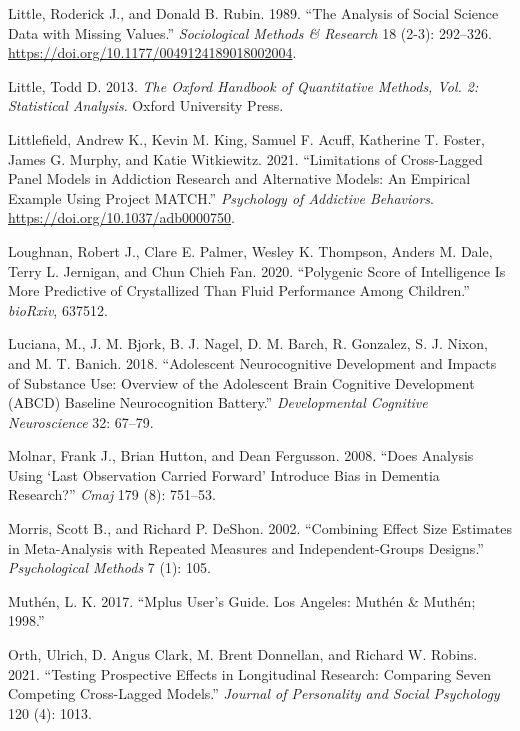 \documentclass[
  letterpaper,
  DIV=11,
  numbers=noendperiod]{scrartcl}
\newlength{\cslhangindent}
\newlength{\cslentryspacingunit} %
\newenvironment{CSLReferences}[2] %
 {%
  \setlength{\parindent}{0pt}
  \ifodd #1
  \let\oldpar\par
  \def\par{\hangindent=\cslhangindent\oldpar}
  \fi
  \setlength{\parskip}{#2\cslentryspacingunit}
 }%
 {}
\begin{document}
\begin{CSLReferences}{1}{0}
\leavevmode{}%
Little, Roderick J., and Donald B. Rubin. 1989. {``The {Analysis} of
{Social} {Science} {Data} with {Missing} {Values}.''} \emph{Sociological
Methods \& Research} 18 (2-3): 292--326.
\url{https://doi.org/10.1177/0049124189018002004}.

\leavevmode{}%
Little, Todd D. 2013. \emph{The {Oxford} {Handbook} of {Quantitative}
{Methods}, {Vol}. 2: {Statistical} {Analysis}}. Oxford University Press.

\leavevmode{}%
Littlefield, Andrew K., Kevin M. King, Samuel F. Acuff, Katherine T.
Foster, James G. Murphy, and Katie Witkiewitz. 2021. {``Limitations of
Cross-Lagged Panel Models in Addiction Research and Alternative Models:
{An} Empirical Example Using Project {MATCH}.''} \emph{Psychology of
Addictive Behaviors}. \url{https://doi.org/10.1037/adb0000750}.

\leavevmode{}%
Loughnan, Robert J., Clare E. Palmer, Wesley K. Thompson, Anders M.
Dale, Terry L. Jernigan, and Chun Chieh Fan. 2020. {``Polygenic Score of
Intelligence Is More Predictive of Crystallized Than Fluid Performance
Among Children.''} \emph{bioRxiv}, 637512.

\leavevmode{}%
Luciana, M., J. M. Bjork, B. J. Nagel, D. M. Barch, R. Gonzalez, S. J.
Nixon, and M. T. Banich. 2018. {``Adolescent Neurocognitive Development
and Impacts of Substance Use: {Overview} of the Adolescent Brain
Cognitive Development ({ABCD}) Baseline Neurocognition Battery.''}
\emph{Developmental Cognitive Neuroscience} 32: 67--79.

\leavevmode{}%
Molnar, Frank J., Brian Hutton, and Dean Fergusson. 2008. {``Does
Analysis Using {`Last Observation Carried Forward'} Introduce Bias in
Dementia Research?''} \emph{Cmaj} 179 (8): 751--53.

\leavevmode{}%
Morris, Scott B., and Richard P. DeShon. 2002. {``Combining Effect Size
Estimates in Meta-Analysis with Repeated Measures and Independent-Groups
Designs.''} \emph{Psychological Methods} 7 (1): 105.

\leavevmode{}%
Muthén, L. K. 2017. {``Mplus User's Guide. {Los} {Angeles}: {Muthén} \&
{Muthén}; 1998.''}

\leavevmode{}%
Orth, Ulrich, D. Angus Clark, M. Brent Donnellan, and Richard W. Robins.
2021. {``Testing Prospective Effects in Longitudinal Research:
{Comparing} Seven Competing Cross-Lagged Models.''} \emph{Journal of
Personality and Social Psychology} 120 (4): 1013.


\end{CSLReferences}
\end{document}
